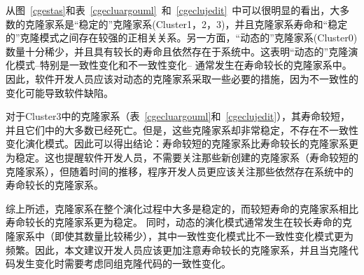 从图~\ref{cgestas}和表~\ref{cgecluargouml}~和~\ref{cgeclujedit}~中可以很明显的看出，大多数的克隆家系是“稳定的”克隆家系(Cluster1，2，3)，并且克隆家系寿命和“稳定的”克隆模式之间存在较强的正相关关系。另一方面，“动态的”克隆家系(Cluster0)数量十分稀少，并且具有较长的寿命且依然存在于系统中。这表明“动态的”克隆演化模式--特别是一致性变化和不一致性变化-- 通常发生在寿命较长的克隆家系中。因此，软件开发人员应该对动态的克隆家系采取一些必要的措施，因为不一致性的变化可能导致软件缺陷。

对于Cluster3中的克隆家系（表~\ref{cgecluargouml}和~\ref{cgeclujedit}），其寿命较短，并且它们中的大多数已经死亡。但是，这些克隆家系却非常稳定，不存在不一致性变化演化模式。因此可以得出结论：寿命较短的克隆家系比寿命较长的克隆家系更为稳定。这也提醒软件开发人员，不需要关注那些新创建的克隆家系（寿命较短的克隆家系），但随着时间的推移，程序开发人员更应该关注那些依然存在系统中的寿命较长的克隆家系。

综上所述，克隆家系在整个演化过程中大多是稳定的，而较短寿命的克隆家系相比寿命较长的克隆家系更为稳定。 同时，动态的演化模式通常发生在较长寿命的克隆家系中（即使其数量比较稀少），其中一致性变化模式比不一致性变化模式更为频繁。因此，本文建议开发人员应该更加注意寿命较长的克隆家系，并且当克隆代码发生变化时需要考虑同组克隆代码的一致性变化。
 
